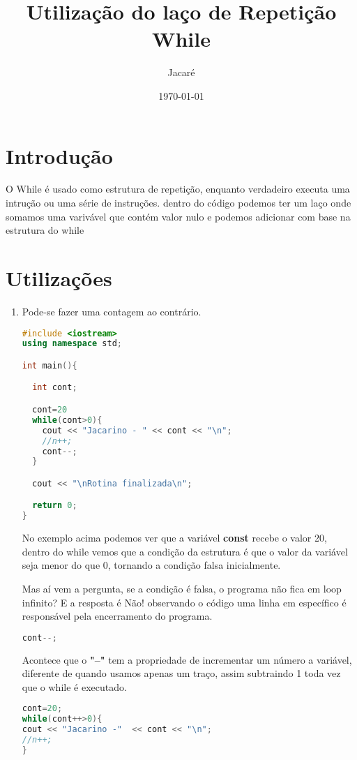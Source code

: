 \documentclass[a4paper, 12pt]{article}
\title{Utilização do laço de Repetição While}
\author{Jacaré}
\date{\today}
\begin{document}
\maketitle

\section{Introdução}

O While é usado como estrutura de repetição, enquanto verdadeiro executa uma intrução ou uma série de instruções.
dentro do código podemos ter um laço onde somamos uma varivável que contém valor nulo e podemos adicionar com base na estrutura do while

\section{Utilizações}

\begin{enumerate}
  \item Pode-se fazer uma contagem ao contrário.
\begin{lstlisting}[language=C++, caption={Contagem ao contrário}, basicstyle=\ttfamily\footnotesize, frame=single]
#include <iostream>
using namespace std;

int main(){

  int cont;

  cont=20
  while(cont>0){
    cout << "Jacarino - " << cont << "\n";
    //n++;
    cont--;
  }

  cout << "\nRotina finalizada\n";

  return 0;
}
\end{lstlisting}

No exemplo acima podemos ver que a variável \textbf{const} recebe o valor 20, dentro do while vemos que a condição da estrutura é que o valor da variável seja menor do que 0, tornando a condição falsa inicialmente.

Mas aí vem a pergunta, se a condição é falsa, o programa não fica em loop infinito?
E a resposta é Não! observando o código uma linha em específico é responsável pela encerramento do programa.


\begin{lstlisting}[language=C++, basicstyle=\ttfamily\footnotesize, frame=single]
cont--;
\end{lstlisting}

Acontece que o \textbf{"--"} tem a propriedade de incrementar um número a variável, diferente de quando usamos apenas um traço, assim subtraindo 1 toda vez que o while é executado.

\begin{lstlisting}[language=C++, caption={Incrementar ou decrementar direto no corpo}, basicstyle=\ttfamily\footnotesize, frame=single]
cont=20;
while(cont++>0){
cout << "Jacarino -"  << cont << "\n";
//n++;
}
\end{lstlisting}


\end{enumerate}
\end{document}
